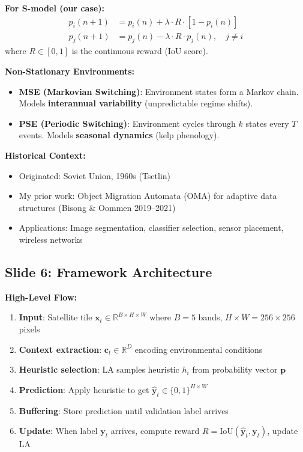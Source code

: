 \documentclass[11pt]{article}
\begin{document}
\textbf{For S-model (our case):}
\begin{align}
p_i(n+1) &= p_i(n) + \lambda \cdot R \cdot [1 - p_i(n)] \\
p_j(n+1) &= p_j(n) - \lambda \cdot R \cdot p_j(n), \quad j \neq i
\end{align}
where $R \in [0,1]$ is the continuous reward (IoU score).

\textbf{Non-Stationary Environments:}
\begin{itemize}
    \item \textbf{MSE (Markovian Switching)}: Environment states form a Markov chain. Models \textbf{interannual variability} (unpredictable regime shifts).
    \item \textbf{PSE (Periodic Switching)}: Environment cycles through $k$ states every $T$ events. Models \textbf{seasonal dynamics} (kelp phenology).
\end{itemize}

\textbf{Historical Context:}
\begin{itemize}
    \item Originated: Soviet Union, 1960s (Tsetlin)
    \item My prior work: Object Migration Automata (OMA) for adaptive data structures (Bisong \& Oommen 2019--2021)
    \item Applications: Image segmentation, classifier selection, sensor placement, wireless networks
\end{itemize}

\subsection{Slide 6: Framework Architecture}

\textbf{High-Level Flow:}

\begin{enumerate}
    \item \textbf{Input}: Satellite tile $\mathbf{x}_t \in \mathbb{R}^{B \times H \times W}$ where $B=5$ bands, $H \times W = 256 \times 256$ pixels
    \item \textbf{Context extraction}: $\mathbf{c}_t \in \mathbb{R}^{D}$ encoding environmental conditions
    \item \textbf{Heuristic selection}: LA samples heuristic $h_i$ from probability vector $\mathbf{p}$
    \item \textbf{Prediction}: Apply heuristic to get $\hat{\mathbf{y}}_t \in \{0,1\}^{H \times W}$
    \item \textbf{Buffering}: Store prediction until validation label arrives
    \item \textbf{Update}: When label $\mathbf{y}_t$ arrives, compute reward $R = \text{IoU}(\hat{\mathbf{y}}_t, \mathbf{y}_t)$, update LA
\end{enumerate}
\end{document}
